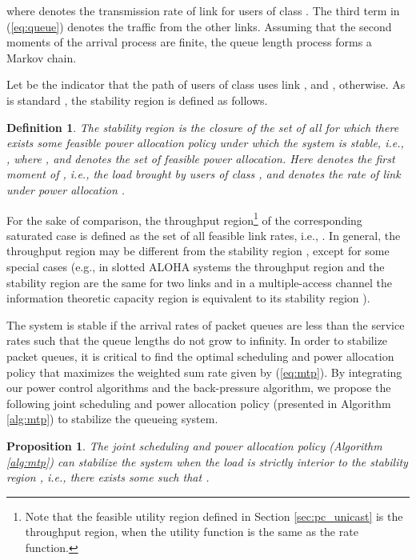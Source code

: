\documentclass[10pt,journal,letterpaper,compsoc]{IEEEtran}
\newtheorem{prop}{\textbf{Proposition}}[section]
\newtheorem{defn}{Definition}
\begin{document}
{{where  denotes the transmission rate of link  for users of class . The third term in (\ref{eq:queue}) denotes the traffic from the other links. Assuming that the second moments of the arrival process  are finite, the queue length process  forms a Markov chain.

Let  be the indicator that the path of users of class  uses link , and , otherwise. As is standard \cite{lin:2008,ephremides:1992,neely:2005}, the stability region is defined as follows.
\begin{defn}
The stability region  is the closure of the set of all  for which there exists some feasible power allocation policy under which the system is stable, i.e., , where , and  denotes the set of feasible power allocation. Here  denotes the first moment of , i.e., the load brought by users of class , and  denotes the rate of link  under power allocation .
\end{defn}

For the sake of comparison, the throughput region\footnote{Note that the feasible utility region  defined in Section \ref{sec:pc_unicast} is the throughput region, when the utility function is the same as the rate function.}  of the corresponding saturated case is defined as the set of all feasible link rates, i.e., . In general, the throughput region  may be different from the stability region , except for some special cases (e.g., in slotted ALOHA systems the throughput region and the stability region are the same \cite{rao:1988} for two links and in a multiple-access channel the information theoretic capacity region is equivalent to its stability region \cite{parande:2008}).


The system is stable if the arrival rates of packet queues are less than the service rates such that the queue lengths do not grow to infinity. In order to stabilize packet queues, it is critical to find the optimal scheduling and power allocation policy that maximizes the weighted sum rate given by (\ref{eq:mtp}). By integrating our power control algorithms and the back-pressure algorithm, we propose the following joint scheduling and power allocation policy (presented in Algorithm \ref{alg:mtp}) to stabilize the queueing system.


\begin{prop}
The joint scheduling and power allocation policy (Algorithm \ref{alg:mtp}) can stabilize the system when the load  is strictly interior to the stability region , i.e., there exists some  such that .
\end{prop}

}}
\end{document}
